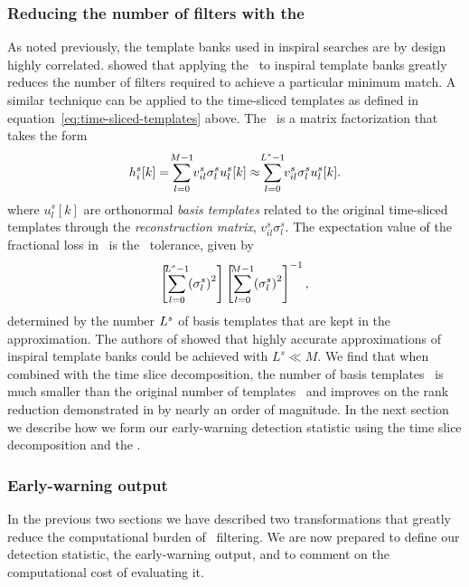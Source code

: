 \subsubsection{Reducing the number of filters with the \SVD{}}
\label{sec:svd}

As noted previously, the template banks used in inspiral searches are by design
highly correlated.  \citet{Cannon:2010p10398} showed that applying the \SVD\
to inspiral template banks greatly reduces the number of filters required to achieve a
particular minimum match.  A similar technique can be applied to the time-sliced
templates as defined in equation~\ref{eq:time-sliced-templates} above.  The \SVD\
is a matrix factorization that takes the form
%
\begin{equation}
h_i^s[k] = \sum_{\mathclap{l=0}}^{\mathclap{M-1}} v_{il}^s \sigma_l^s u_l^s[k] \approx \sum_{\mathclap{l=0}}^{\mathclap{L^s-1}} v_{il}^s \sigma_l^s u_l^s[k].
\label{eq:svddecomp}
\end{equation}
where $u_l^s[k]$ are orthonormal \emph{basis templates} related to the original
time-sliced templates through the \emph{reconstruction matrix}, $v_{il}^s\sigma_l^s$.
The expectation value of the fractional loss in \SNR\ is the \SVD\ tolerance, given by
%
\begin{equation*}
\left[ \sum_{\mathclap{l=0}}^{\mathclap{L^s-1}} \left( \sigma_l^s \right)^2 \right]\left[ \sum_{\mathclap{l=0}}^{\mathclap{M-1}} \left( \sigma_l^s \right)^2 \right]^{-1},
\end{equation*}
%
determined by the number $L^s$ of basis templates that are kept in
the approximation.  The authors of \citet{Cannon:2010p10398}
showed that highly accurate approximations of inspiral template banks could be
achieved with $L^s \ll M$.  We find that when combined with the
time slice decomposition, the number of basis templates \numsvdtmps\ is much
smaller than the original number of templates \numtmps\ and improves on the
rank reduction demonstrated in \citep{Cannon:2010p10398} by nearly an order
of magnitude.  In the next section we describe how we form our early-warning
detection statistic using the time slice decomposition and the \SVD.

\subsubsection{Early-warning output}

In the previous two sections we have described two transformations that greatly
reduce the computational burden of \TD\ filtering.  We are now prepared to define
our detection statistic, the early-warning output, and to comment on the computational
cost of evaluating it.

